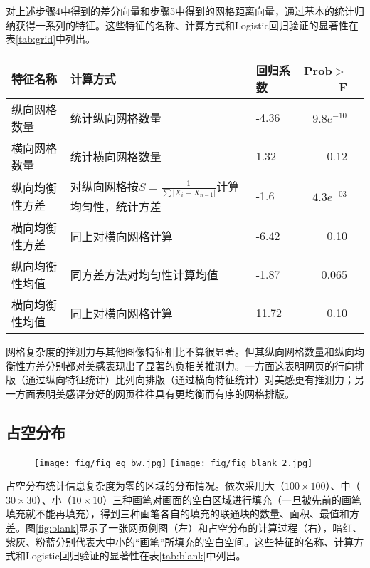 对上述步骤4中得到的差分向量和步骤5中得到的网格距离向量，通过基本的统计归纳获得一系列的特征。这些特征的名称、计算方式和Logistic回归验证的显著性在表\ref{tab:grid}中列出。

\begin{table}[H]
  \centering
  \small
  \begin{tabular}{lllrr}
    \hline
     特征名称 & 计算方式 & 回归系数 & Prob$>$F \\
    \hline
    纵向网格数量 & 统计纵向网格数量 & -4.36 & $9.8e^{-10}$\\
    横向网格数量 & 统计横向网格数量 & 1.32 & 0.12\\ %
    纵向均衡性方差 & 对纵向网格按$S = \frac{1}{\sum | X_i - X_{n-1}|}$计算均匀性，统计方差 & -1.6 & $4.3e^{-03}$\\
    横向均衡性方差 & 同上对横向网格计算 & -6.42 & 0.10\\
    纵向均衡性均值 & 同方差方法对均匀性计算均值 & -1.87 & 0.065\\
    横向均衡性均值 & 同上对横向网格计算 & 11.72 & 0.10\\
    \hline
  \end{tabular}
\end{table}

\clearpage
网格复杂度的推测力与其他图像特征相比不算很显著。但其纵向网格数量和纵向均衡性方差分别都对美感表现出了显著的负相关推测力。一方面这表明网页的行向排版（通过纵向特征统计）比列向排版（通过横向特征统计）对美感更有推测力；另一方面表明美感评分好的网页往往具有更均衡而有序的网格排版。

\subsection{占空分布}
\begin{figure}[H]
  \texttt{[image: fig/fig\_eg\_bw.jpg]}
  \texttt{[image: fig/fig\_blank\_2.jpg]}
\end{figure}

占空分布统计信息复杂度为零的区域的分布情况。依次采用大（$100\times100$）、中（$30\times30$）、小（$10\times10$）三种画笔对画面的空白区域进行填充（一旦被先前的画笔填充就不能再填充），得到三种画笔各自的填充的联通块的数量、面积、最值和方差。图\ref{fig:blank}显示了一张网页例图（左）和占空分布的计算过程（右），暗红、紫灰、粉蓝分别代表大中小的“画笔”所填充的空白空间。这些特征的名称、计算方式和Logistic回归验证的显著性在表\ref{tab:blank}中列出。

